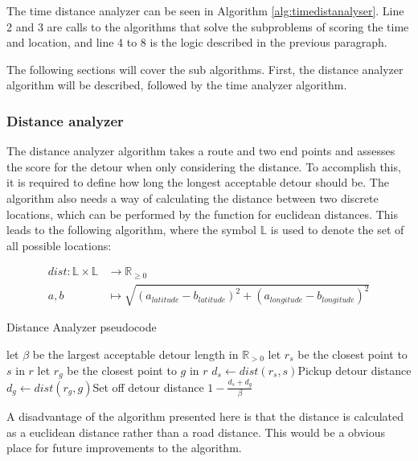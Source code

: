 The time distance analyzer can be seen in Algorithm \ref{alg:timedistanalyser}.
Line 2 and 3 are calls to the algorithms that solve the subproblems of scoring the time and location, and line 4 to 8 is the logic described in the previous paragraph.

The following sections will cover the sub algorithms.
First, the distance analyzer algorithm will be described, followed by the time analyzer algorithm.

\subsubsection{Distance analyzer}
The distance analyzer algorithm takes a route and two end points and assesses the score for the detour when only considering the distance.
To accomplish this, it is required to define how long the longest acceptable detour should be.
The algorithm also needs a way of calculating the distance between two discrete locations, which can be performed by the function for euclidean distances.
This leads to the following algorithm, where the symbol $\mathbb{L}$ is used to denote the set of all possible locations:

\begin{align*}
	dist : \mathbb{L}\times\mathbb{L} &\rightarrow \mathbb{R}_{\geq 0}\\
	a, b &\mapsto \sqrt{(a_{latitude} - b_{latitude})^2 + (a_{longitude} - b_{longitude})^2}
\end{align*}

\begin{algorithm}
	\caption{Distance Analyzer pseudocode}
	\label{alg:distanalyser}
	\begin{algorithmic}[1]
		\Require 
		\Statex let $\beta$ be the largest acceptable detour length in $\mathbb{R}_{>0}$ 
		\Statex 
			\State let $r_s$ be the closest point to $s$ in $r$
			\State let $r_g$ be the closest point to $g$ in $r$
			\State $d_s\gets dist(r_s, s)$\Comment Pickup detour distance
			\State $d_g\gets dist(r_g, g)$\Comment Set off detour distance
			\State\Return $1-\frac{d_s + d_g}{\beta}$
		\EndFunction
	\end{algorithmic}
\end{algorithm}

A disadvantage of the algorithm presented here is that the distance is calculated as a euclidean distance rather than a road distance. 
This would be a obvious place for future improvements to the algorithm.

